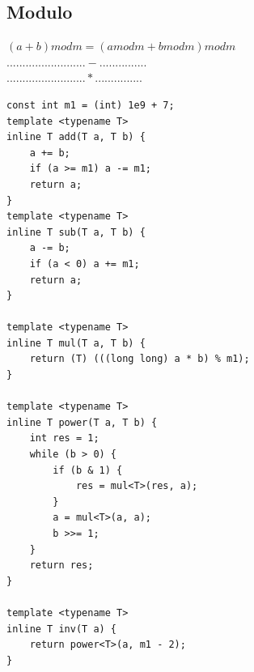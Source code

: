 \documentclass[8pt, a4paper, oneside, twocolumn]{extarticle}
\begin{document}
\subsection{Modulo}
$(a + b) mod m = (a mod m + b mod m) mod m$\\
$.........................-...............$\\
$.........................*...............$\\
\begin{verbatim}
const int m1 = (int) 1e9 + 7;
template <typename T>
inline T add(T a, T b) {
    a += b;
    if (a >= m1) a -= m1;
    return a;
}
template <typename T>
inline T sub(T a, T b) {
    a -= b;
    if (a < 0) a += m1;
    return a;
}

template <typename T>
inline T mul(T a, T b) {
    return (T) (((long long) a * b) % m1);
}

template <typename T>
inline T power(T a, T b) {
    int res = 1;
    while (b > 0) {
        if (b & 1) {
            res = mul<T>(res, a);
        }
        a = mul<T>(a, a);
        b >>= 1;
    }
    return res;
}

template <typename T>
inline T inv(T a) {
    return power<T>(a, m1 - 2);
}
\end{verbatim}
\end{document}
